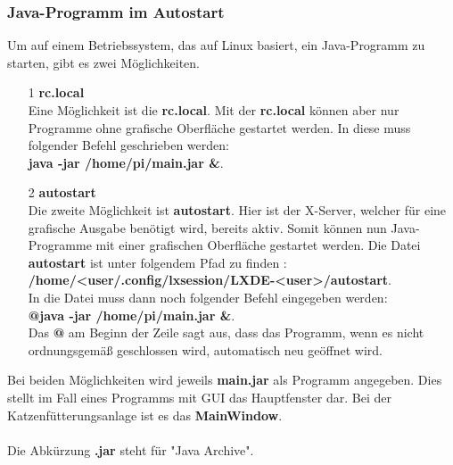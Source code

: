 \subsubsection{Java-Programm im Autostart}\label{subsubsec:Autostart}
Um auf einem Betriebssystem, das auf Linux basiert, ein Java-Programm zu starten, gibt es zwei Möglichkeiten.
\begin{itemize}
\item[1] \textbf{rc.local}
\\ Eine Möglichkeit ist die \textbf{rc.local}. Mit der \textbf{rc.local} können aber nur Programme ohne grafische Oberfläche gestartet werden. In diese muss folgender Befehl geschrieben werden: 
\\ \textbf{java -jar /home/pi/main.jar \&}.
\item[2] \textbf{autostart}
\\ Die zweite Möglichkeit ist \textbf{autostart}. Hier ist der X-Server, welcher für eine grafische Ausgabe benötigt wird, bereits aktiv. Somit können nun Java-Programme mit einer grafischen Oberfläche gestartet werden. Die Datei \textbf{autostart} ist unter folgendem Pfad zu finden : 
\\ \textbf{/home/<user/.config/lxsession/LXDE-<user>/autostart}. 
\\ In die Datei muss dann noch folgender Befehl eingegeben werden: 
\\ \textbf{@java -jar /home/pi/main.jar \&}.
\\Das \textbf{@} am Beginn der Zeile sagt aus, dass das Programm, wenn es nicht ordnungsgemäß geschlossen wird, automatisch neu geöffnet wird.
\end{itemize} 
Bei beiden Möglichkeiten wird jeweils \textbf{main.jar} als Programm angegeben. Dies stellt im Fall eines Programms mit \ac{GUI} das Hauptfenster dar. Bei der Katzenfütterungsanlage ist es das \textbf{MainWindow}.
\\ \\ Die Abkürzung \textbf{.jar} steht für "Java Archive".

\newpage

